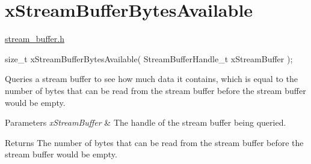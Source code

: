 \hypertarget{group__x_stream_buffer_bytes_available}{}\section{x\+Stream\+Buffer\+Bytes\+Available}
\label{group__x_stream_buffer_bytes_available}
\mbox{\hyperlink{stream__buffer_8h_source}{stream\+\_\+buffer.\+h}}


\begin{DoxyPre}
size\_t xStreamBufferBytesAvailable( StreamBufferHandle\_t xStreamBuffer );
\end{DoxyPre}


Queries a stream buffer to see how much data it contains, which is equal to the number of bytes that can be read from the stream buffer before the stream buffer would be empty.


\begin{DoxyParams}{Parameters}
{\em x\+Stream\+Buffer} & The handle of the stream buffer being queried.\\
\hline
\end{DoxyParams}
\begin{DoxyReturn}{Returns}
The number of bytes that can be read from the stream buffer before the stream buffer would be empty. 
\end{DoxyReturn}
